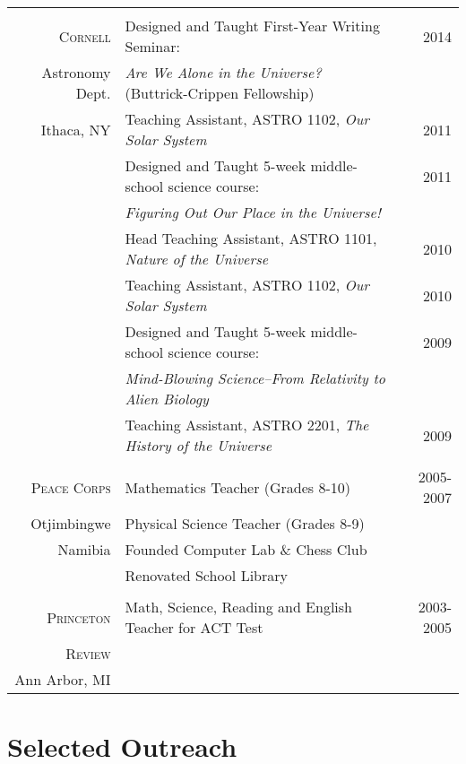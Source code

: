 \documentclass[10pt]{article} %
\begin{document}
{\begin{tabular}{>{\hfill}r|p{11.2cm}r}
\multicolumn{3}{c}{} \\
\textsc{Cornell} & Designed and Taught First-Year Writing Seminar: & 2014 \\
Astronomy Dept.& \hspace{0.25cm} {\it Are We Alone in the Universe?} (Buttrick-Crippen Fellowship) \\
Ithaca, NY & Teaching Assistant, ASTRO 1102, {\it Our Solar System} & 2011 \\
& Designed and Taught 5-week middle-school science course: & 2011\\
& \hspace{0.25cm} {\it Figuring Out Our Place in the Universe!} \\
& Head Teaching Assistant, ASTRO 1101, {\it Nature of the Universe} & 2010\\
& Teaching Assistant, ASTRO 1102, {\it Our Solar System} & 2010 \\
& Designed and Taught 5-week middle-school science course: & 2009\\
& \hspace{0.25cm} {\it Mind-Blowing Science--From Relativity to Alien Biology} \\
& Teaching Assistant, ASTRO 2201, {\it The History of the Universe} & 2009 \\
\multicolumn{3}{c}{} \\

\textsc{Peace Corps} & Mathematics Teacher (Grades 8-10) & 2005-2007\\
Otjimbingwe & Physical Science Teacher (Grades 8-9) \\
Namibia& Founded Computer Lab \& Chess Club \\
& Renovated School Library \\
\multicolumn{2}{c}{} \\

\textsc{Princeton} & Math, Science, Reading and English Teacher for ACT Test & 2003-2005\\
\textsc{Review} \\
Ann Arbor, MI
\end{tabular}


\section{Selected Outreach}

}
\end{document}
